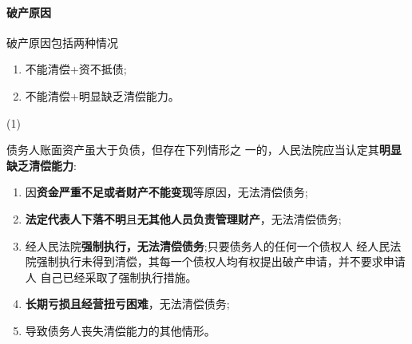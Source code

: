 \documentclass[UTF8,12pt]{ctexart}
\numberwithin{equation}{section} %
\numberwithin{figure}{section}
\numberwithin{table}{section}
\begin{document}
	\paragraph{破产原因}
	破产原因包括两种情况
	\begin{enumerate}
		\item 不能清偿+资不抵债;
		
		\item 不能清偿+明显缺乏清偿能力。
	\end{enumerate}(1)

	债务人账面资产虽大于负债，但存在下列情形之 一的，人民法院应当认定其\textbf{明显缺乏清偿能力}: 
	\begin{enumerate}
		\item 因\textbf{资金严重不足或者财产不能变现}等原因，无法清偿债务; 
		
		\item \textbf{法定代表人下落不明}且\textbf{无其他人员负责管理财产}，无法清偿债务;
		
		\item 经人民法院\textbf{强制执行，无法清偿债务};只要债务人的任何一个债权人 经人民法院强制执行未得到清偿，其每一个债权人均有权提出破产申请，并不要求申请人 自己已经采取了强制执行措施。
		
		\item \textbf{长期亏损且经营扭亏困难}，无法清偿债务;
		
		\item 导致债务人丧失清偿能力的其他情形。
	\end{enumerate}
\end{document}
